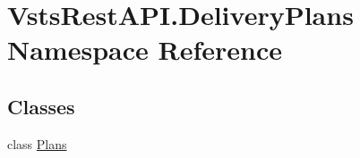 \hypertarget{namespace_vsts_rest_a_p_i_1_1_delivery_plans}{}\section{Vsts\+Rest\+A\+P\+I.\+Delivery\+Plans Namespace Reference}
\label{namespace_vsts_rest_a_p_i_1_1_delivery_plans}
\subsection*{Classes}
\begin{DoxyCompactItemize}
\item 
class \mbox{\hyperlink{class_vsts_rest_a_p_i_1_1_delivery_plans_1_1_plans}{Plans}}
\end{DoxyCompactItemize}
